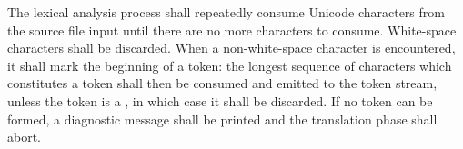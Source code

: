 

\specsubitem
The lexical analysis process shall repeatedly consume Unicode characters from
the source file input until there are no more characters to consume. White-space
characters shall be discarded. When a non-white-space character is encountered,
it shall mark the beginning of a token: the longest sequence of characters which
constitutes a token shall then be consumed and emitted to the token stream,
unless the token is a , in which case it shall be
discarded. If no token can be formed, a diagnostic message shall be printed and
the translation phase shall abort.
